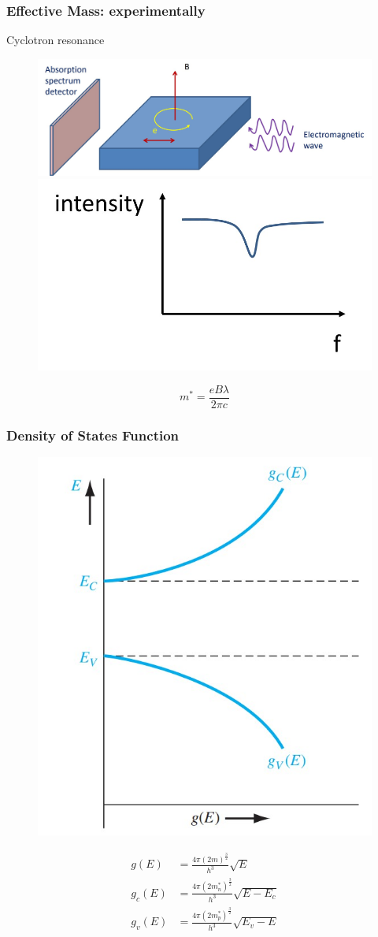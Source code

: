 \documentclass{beamer}
\begin{document}
    \begin{frame} \frametitle{Effective Mass: experimentally}
        Cyclotron resonance
        \begin{figure}[H]
            \centering
            \includegraphics[width=0.6\linewidth]{Effective-mass-experiment.jpg}
            \includegraphics[width=0.3\linewidth]{Effective-mass-experiment-graph.jpg}
            \label{fig:Effective-mass-experiment.jpg}
        \end{figure}
        \begin{equation*}
            \boxed{m^* = \frac{eB\lambda}{2\pi c} }
        \end{equation*}
    \end{frame}

    \begin{frame} \frametitle{Density of States Function}
        \begin{figure}[H]
            \centering
            \includegraphics[width=0.3\linewidth]{Density-state-function.jpg}
            \label{fig:Density-state-function.jpg}
        \end{figure}
        \begin{equation*}
            \boxed{
                \begin{aligned}
                    g(E) &= \frac{4 \pi (2m)^{\frac{3}{2} }}{h^3} \sqrt{E}  \\
                    g_c(E) &= \frac{4 \pi (2m_n^*)^{\frac{3}{2} }}{h^3} \sqrt{E - E_c}  \\
                    g_v(E) &= \frac{4 \pi (2m_p^*)^{\frac{3}{2} }}{h^3} \sqrt{E_v - E}  \\
                \end{aligned}
            }
        \end{equation*}
    \end{frame}
\end{document}
